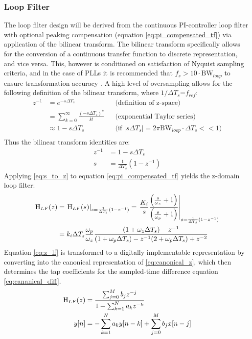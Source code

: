 	\subsubsection{Loop Filter}
		The loop filter design will be derived from the continuous PI-controller loop filter with optional peaking compensation (equation \ref{eq:pi_compensated_tf}) via application of the bilinear transform. The bilinear transform specifically allows for the conversion of a continuous transfer function to discrete representation, and vice versa. This, however is conditioned on satisfaction of Nyquist sampling criteria, and in the case of PLLs it is recommended that $f_s > 10\cdot\mathrm{BW}_{loop}$ to ensure transformation accuracy \cite{gardner_1980}. A high level of oversampling allows for the following definition of the bilinear transform, where $1/\Delta T_s$=$f_{ref}$:
		\begin{align*}
			z^{-1} &= e^{-s\Delta T_s} && \text{(definition of z-space)} \\
			&= \sum_{k=0}^\infty\frac{(-s\Delta T_s)^k}{k!} && \text{(exponential Taylor series)} \\
			&\approx 1-s\Delta T_s &&\text{(if $|s\Delta T_s| = 2\pi\mathrm{BW}_{loop}\cdot \Delta T_s << 1$)} \\
		\end{align*}
		Thus the bilinear transform identities are:
		\begin{align}
			z^{-1} &= 1-s\Delta T_s\\
			s &= \frac{1}{\Delta T_s}(1-z^{-1}) \label{eq:s_to_z}
		\end{align}
		Applying \ref{eq:s_to_z} to equation \ref{eq:pi_compensated_tf} yields the z-domain loop filter:
		\begin{align}
			\textnormal{H}_{LF}(z) &= \left.\textnormal{H}_{LF}(s)\right\vert_{s=\frac{1}{\Delta T_s}(1-z^{-1})} = \left.\frac{K_i}{s}\frac{\left(\frac{s}{\omega_z} + 1\right)}{\left(\frac{s}{\omega_p} + 1\right)}\right\vert_{s=\frac{1}{\Delta T_s}(1-z^{-1})}\\
			&= k_i\Delta T_s\frac{\omega_p}{\omega_z}\frac{(1+\omega_z\Delta T_s)-z^{-1}}{(1+\omega_p\Delta T_s) - z^{-1}(2+\omega_p\Delta T_s) + z^{-2}}\label{eq:z_lf}
		\end{align}
		Equation \ref{eq:z_lf} is transformed to a digitally implementable representation by converting into the canonical representation of \ref{eq:canonical_z}, which then determines the tap coefficients for the sampled-time difference equation \ref{eq:cananical_diff}. 
		\begin{align}
			\textnormal{H}_{LF}(z) &= \frac{\sum_{j=0}^M b_jz^{-j}}{1+\sum_{k=1}^N a_kz^{-k}}\label{eq:canonical_z} \\
			y[n]&= -\sum_{k=1}^N a_ky[n-k] + \sum_{j=0}^M b_jx[n-j] \label{eq:cananical_diff}
		\end{align}

